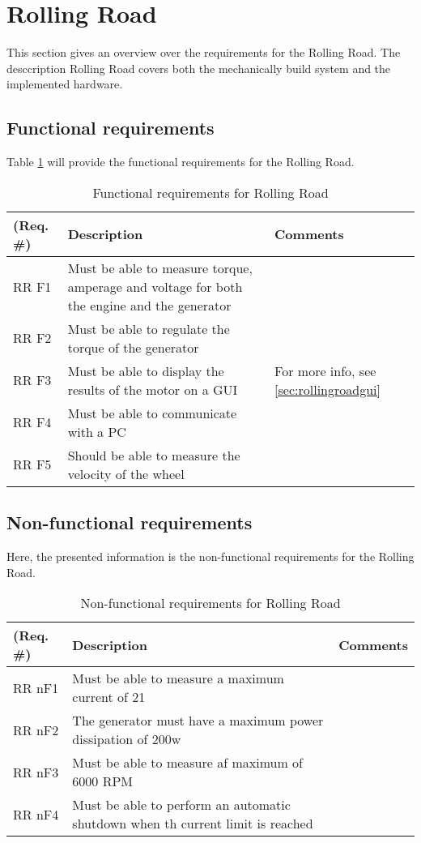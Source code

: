\section{Rolling Road}
This section gives an overview over the requirements for the Rolling Road. The desccription Rolling Road covers both the mechanically build system and the implemented hardware. 

\subsection{Functional requirements}
Table \ref{Functional:Rolling Road} will provide the functional requirements for the Rolling Road.

\begin{table}[h!]
	\centering
	\begin{tabular}{|p{2 cm}|p{4 cm}|p{3 cm}|}
	\hline
	\textbf{(Req. \#)} & \textbf{Description} & \textbf{Comments} \\\hline
	RR F1	& Must be able to measure torque, amperage and voltage for both the engine and the generator  &   \\\hline
	RR F2	& Must be able to regulate the torque of the generator &   \\\hline
	RR F3	& Must be able to display the results of the motor on a GUI & For more info, see \ref{sec:rollingroadgui}  \\\hline
	RR F4	& Must be able to communicate with a PC &   \\\hline
	RR F5	& Should be able to measure the velocity of the wheel &   \\\hline
	\end{tabular}
	\label{Functional:Rolling Road}
	\caption{Functional requirements for Rolling Road}
\end{table}

\subsection{Non-functional requirements}
Here, the presented information is the non-functional requirements for the Rolling Road.

\begin{table}[h!]
	\centering
	\begin{tabular}{|p{2 cm}|p{4 cm}|p{3 cm}|}
		\hline
		\textbf{(Req. \#)} & \textbf{Description} & \textbf{Comments} \\\hline
		RR nF1	& Must be able to measure a maximum current of 21 \fxnote{tjek op på dette}  &   \\\hline
		RR nF2	& The generator must have a maximum power dissipation of 200w &   \\\hline
		RR nF3	& Must be able to measure af maximum of 6000 RPM &   \\\hline
		RR nF4	& Must be able to perform an automatic shutdown when th current limit is reached &   \\\hline
	\end{tabular}
	\label{Nonfunctional:RollingRoad}
	\caption{Non-functional requirements for Rolling Road}
\end{table}